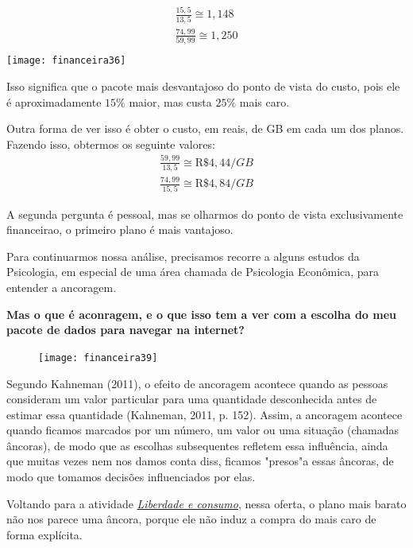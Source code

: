\setlength{\columnsep}{-1cm}
\begin{multicols}{2}

\null\vfill
\begin{align*}
\frac{15{,}5}{13{,}5}\cong1{,}148\\
\frac{74{,}99}{59{,}99}\cong1{,}250\\
\end{align*}
\vfill\null
\flushleft
\texttt{[image: financeira36]}
\end{multicols}

Isso significa que o pacote mais desvantajoso do ponto de vista do custo, pois ele é aproximadamente $15$\% maior, mas custa $25\%$ mais caro.

\clearpage
Outra forma de ver isso é obter o custo, em reais, de GB em cada um dos planos. Fazendo isso, obtermos os seguinte valores:
\begin{align*}
\frac{59{,}99}{13{,}5}\cong\text{R\$}4{,}44/GB\\
\frac{74{,}99}{15{,}5}\cong\text{R\$}4{,}84/GB
\end{align*}

A segunda pergunta é pessoal, mas se olharmos do ponto de vista exclusivamente financeirao, o primeiro plano é mais vantajoso.

Para continuarmos nossa análise, precisamos recorre a alguns estudos da Psicologia, em especial de uma área chamada de Psicologia Econômica, para entender a ancoragem. 

\textbf{Mas o que é aconragem, e o que isso tem a ver com a escolha do meu pacote de dados para navegar na internet?}

\setlength{\columnsep}{18pt}
\begin{figure}
\vspace{-1em}
\texttt{[image: financeira39]}

\end{figure}

Segundo Kahneman (2011), o efeito de ancoragem acontece quando as pessoas consideram um valor particular para uma quantidade desconhecida antes de estimar essa quantidade (Kahneman, 2011, p. 152). Assim, a ancoragem acontece quando ficamos marcados por um número, um valor ou uma situação (chamadas âncoras), de modo que as escolhas subsequentes refletem essa influência, ainda que muitas vezes nem nos damos conta diss, ficamos "presos"a essas âncoras, de modo que tomamos decisões influenciados por elas.

Voltando para a atividade \hyperref[liberdade-consumo]{\textit{Liberdade e consumo}}, nessa oferta, o plano mais barato não nos parece uma âncora, porque ele não induz a compra do mais caro de forma explícita. 

